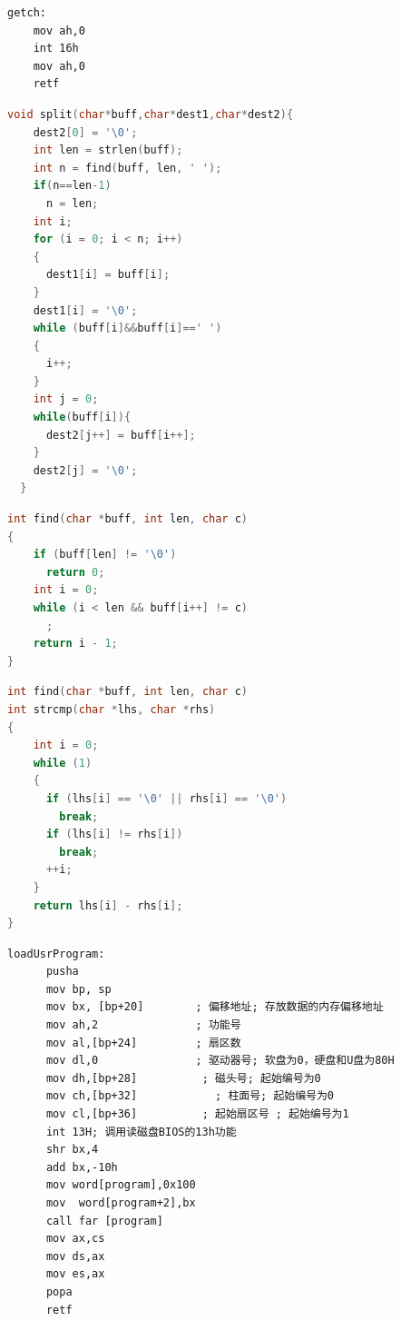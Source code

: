\documentclass[a4paper, 11pt]{article} %
\begin{document}
\begin{lstlisting}[language={[x86masm]Assembler},label=getch,caption=getch]
getch:
    mov ah,0
    int 16h
    mov ah,0
    retf
\end{lstlisting}

\begin{lstlisting}[language={c},label=split,caption=split]
void split(char*buff,char*dest1,char*dest2){
    dest2[0] = '\0';
    int len = strlen(buff);
    int n = find(buff, len, ' ');
    if(n==len-1)
      n = len;
    int i;
    for (i = 0; i < n; i++)
    {
      dest1[i] = buff[i];
    }
    dest1[i] = '\0';
    while (buff[i]&&buff[i]==' ')
    {
      i++;
    }
    int j = 0;
    while(buff[i]){
      dest2[j++] = buff[i++];
    }
    dest2[j] = '\0';
  }
\end{lstlisting}

\begin{lstlisting}[language={c},label=getch,caption=getch]
int find(char *buff, int len, char c)
{
    if (buff[len] != '\0')
      return 0;
    int i = 0;
    while (i < len && buff[i++] != c)
      ;
    return i - 1;
}
\end{lstlisting}

\begin{lstlisting}[language={c},label=strcmp,caption=strcmp]
int find(char *buff, int len, char c)
int strcmp(char *lhs, char *rhs)
{
    int i = 0;
    while (1)
    {
      if (lhs[i] == '\0' || rhs[i] == '\0')
        break;
      if (lhs[i] != rhs[i])
        break;
      ++i;
    }
    return lhs[i] - rhs[i];
}
\end{lstlisting}
  
\begin{lstlisting}[language={[x86masm]Assembler},label=loadUsrProgram,caption=强制关机]
  loadUsrProgram:           
      pusha
      mov bp, sp
      mov bx, [bp+20]        ; 偏移地址; 存放数据的内存偏移地址
      mov ah,2               ; 功能号
      mov al,[bp+24]         ; 扇区数
      mov dl,0               ; 驱动器号; 软盘为0，硬盘和U盘为80H
      mov dh,[bp+28]          ; 磁头号; 起始编号为0
      mov ch,[bp+32]            ; 柱面号; 起始编号为0
      mov cl,[bp+36]          ; 起始扇区号 ; 起始编号为1
      int 13H; 调用读磁盘BIOS的13h功能
      shr bx,4
      add bx,-10h
      mov word[program],0x100
      mov  word[program+2],bx
      call far [program]
      mov ax,cs
      mov ds,ax
      mov es,ax
      popa
      retf
  \end{lstlisting}
\end{document}
